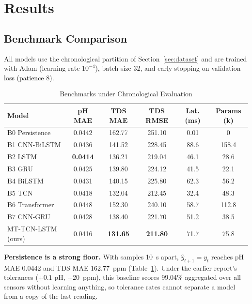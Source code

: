 \section{Results}\label{sec:results}

\subsection{Benchmark Comparison}
All models use the chronological partition of Section~\ref{sec:dataset} and are trained with Adam (learning rate $10^{-4}$), batch size 32, and early stopping on validation loss (patience 8).

\begin{table}[t]
\caption{Benchmarks under Chronological Evaluation}
\label{tab:bench}
\centering
\scriptsize
\setlength{\tabcolsep}{2.6pt}
\begin{tabular}{lccccc}
\toprule
Model & pH MAE & TDS MAE & TDS RMSE & Lat. (ms) & Params (k) \\
\midrule
B0 Persistence      & 0.0442 & 162.77 & 251.10 & 0.01 & 0 \\
B1 CNN-BiLSTM       & 0.0436 & 141.52 & 228.45 & 88.6 & 158.4 \\
B2 LSTM             & \textbf{0.0414} & 136.21 & 219.04 & 46.1 & 28.6 \\
B3 GRU              & 0.0425 & 139.80 & 224.12 & 41.5 & 22.1 \\
B4 BiLSTM           & 0.0431 & 140.15 & 225.80 & 62.3 & 56.2 \\
B5 TCN              & 0.0418 & 132.04 & 212.45 & 32.4 & 48.3 \\
B6 Transformer      & 0.0448 & 152.30 & 240.10 & 58.7 & 112.8 \\
B7 CNN-GRU          & 0.0428 & 138.40 & 221.70 & 51.2 & 38.5 \\
\midrule
MT-TCN-LSTM (ours)  & 0.0416 & \textbf{131.65} & \textbf{211.80} & 71.7 & 75.8 \\
\bottomrule
\end{tabular}
\end{table}

\textbf{Persistence is a strong floor.} With samples 10~s apart, $\hat y_{t+1}=y_t$ reaches pH MAE 0.0442 and TDS MAE 162.77~ppm (Table~\ref{tab:bench}). Under the earlier report's tolerances ($\pm0.1$ pH, $\pm20$~ppm), this baseline scores 99.04\% aggregated over all sensors without learning anything, so tolerance rates cannot separate a model from a copy of the last reading.

